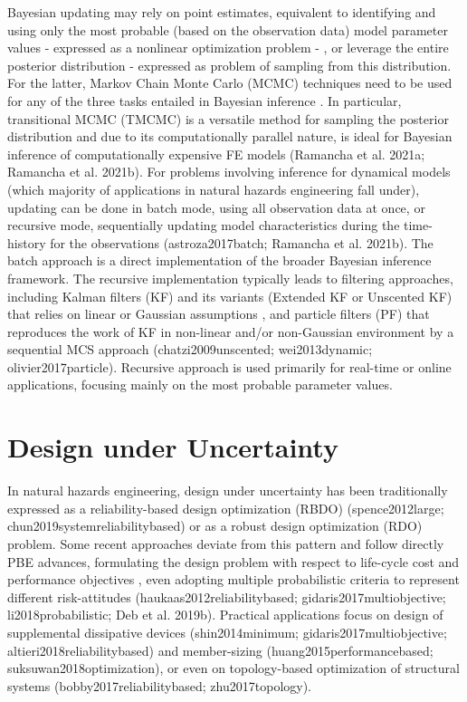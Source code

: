 Bayesian updating may rely on point estimates, equivalent to identifying and using only the most probable (based on the observation data) model parameter values - expressed as a nonlinear optimization problem - , or leverage the entire posterior distribution - expressed as problem of sampling from this distribution. For the latter, Markov Chain Monte Carlo (MCMC) techniques need to be used for any of the three tasks entailed in Bayesian inference \citep{catanach2018bayesian}. In particular, transitional MCMC (TMCMC) is a versatile method for sampling the posterior distribution \citep{ching2007transitional,betz2016transitional} and due to its computationally parallel nature, is ideal for Bayesian inference of computationally expensive FE models (Ramancha et al. 2021a; Ramancha et al. 2021b). For problems involving inference for dynamical models (which majority of applications in natural hazards engineering fall under), updating can be done in batch mode, using all observation data at once, or recursive mode, sequentially updating model characteristics during the time-history for the observations (astroza2017batch; Ramancha et al. 2021b). The batch approach is a direct implementation of the broader Bayesian inference framework. The recursive implementation typically leads to filtering approaches, including Kalman filters (KF) and its variants (Extended KF or Unscented KF) that relies on linear or Gaussian assumptions \citep{astroza2017batch,kontoroupi2017online,erazo2018bayesian}, and particle filters (PF) that reproduces the work of KF in non-linear and/or non-Gaussian environment by a sequential MCS approach (chatzi2009unscented; wei2013dynamic; olivier2017particle). Recursive approach is used primarily for real-time or online applications, focusing mainly on the most probable parameter values. 

\section{Design under Uncertainty}
\label{sec:uq_design}

In natural hazards engineering, design under uncertainty has been traditionally expressed as a reliability-based design optimization (RBDO) (spence2012large; chun2019systemreliabilitybased) or as a robust design optimization (RDO) \citep{greco2015robust} problem. Some recent approaches deviate from this pattern and follow directly PBE advances, formulating the design problem with respect to life-cycle cost and performance objectives \citep{shin2014minimum}, even adopting multiple probabilistic criteria to represent different risk-attitudes (haukaas2012reliabilitybased; gidaris2017multiobjective; li2018probabilistic; Deb et al. 2019b). Practical applications focus on design of supplemental dissipative devices (shin2014minimum; gidaris2017multiobjective; altieri2018reliabilitybased) and member-sizing (huang2015performancebased; suksuwan2018optimization), or even on topology-based optimization of structural systems (bobby2017reliabilitybased; zhu2017topology).

